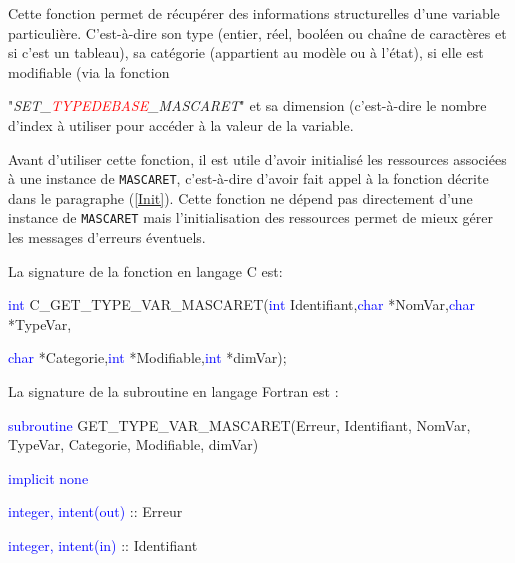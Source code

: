 \documentclass[a4paper,11pt]{article}
\begin{document}
 Cette fonction permet de r\'ecup\'erer des informations structurelles d'une variable particuli\`ere. C'est-\`a-dire son type (entier, r\'eel, bool\'een ou cha\^ine de caract\`eres et si c'est un tableau), sa cat\'egorie (appartient au mod\`ele ou \`a l'\'etat), si elle est modifiable (via la fonction 
 
 "\textit{SET\_\textcolor{red}{TYPEDEBASE}\_MASCARET}" et sa dimension (c'est-\`a-dire le nombre d'index \`a utiliser pour acc\'eder \`a la valeur de la variable.
 
 \vspace{0.5cm}
 
 Avant d'utiliser cette fonction, il est utile d'avoir initialis\'e les ressources associ\'ees \`a une instance de \texttt{MASCARET}, c'est-\`a-dire d'avoir fait appel \`a la fonction d\'ecrite dans le paragraphe (\ref{Init}). Cette fonction ne d\'epend pas directement d'une instance de \texttt{MASCARET} mais l'initialisation des ressources permet de mieux g\'erer les messages d'erreurs \'eventuels.
 
 \vspace{0.5cm}
 
 La signature de la fonction en langage C est:
 
 \vspace{0.5cm}
 
 \textcolor{blue}{int} C\_GET\_TYPE\_VAR\_MASCARET(\textcolor{blue}{int} Identifiant,\textcolor{blue}{char} *NomVar,\textcolor{blue}{char} *TypeVar,
 
 \textcolor{blue}{char} *Categorie,\textcolor{blue}{int} *Modifiable,\textcolor{blue}{int} *dimVar);
 
 \vspace{0.5cm} 

 La signature de la subroutine en langage Fortran est :
 
 \vspace{0.5cm}
 
    \textcolor{blue}{subroutine} GET\_TYPE\_VAR\_MASCARET(Erreur, Identifiant, NomVar, TypeVar, Categorie, Modifiable, dimVar)
    
        \hspace{1cm}\textcolor{blue}{implicit none}                 
        
        \hspace{1cm} \textcolor{blue}{integer, intent(out)} :: Erreur
        
        \hspace{1cm} \textcolor{blue}{integer, intent(in)}  :: Identifiant
        
\end{document}
